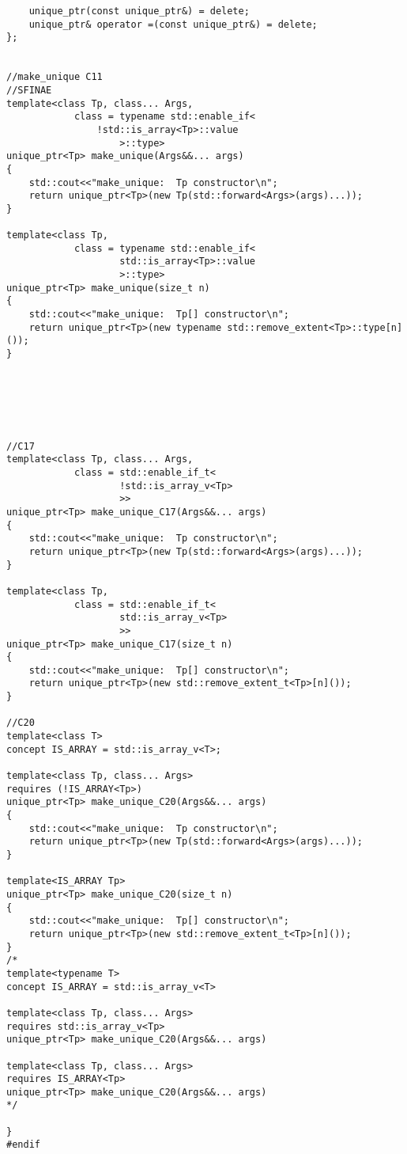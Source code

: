 \begin{lstlisting}
	unique_ptr(const unique_ptr&) = delete;
	unique_ptr& operator =(const unique_ptr&) = delete;
};


//make_unique C11
//SFINAE
template<class Tp, class... Args, 
			class = typename std::enable_if<
				!std::is_array<Tp>::value
					>::type>
unique_ptr<Tp> make_unique(Args&&... args)
{
	std::cout<<"make_unique:  Tp constructor\n";
	return unique_ptr<Tp>(new Tp(std::forward<Args>(args)...));
}

template<class Tp, 
			class = typename std::enable_if<
					std::is_array<Tp>::value
					>::type>
unique_ptr<Tp> make_unique(size_t n)
{
	std::cout<<"make_unique:  Tp[] constructor\n";
	return unique_ptr<Tp>(new typename std::remove_extent<Tp>::type[n]());
}






//C17
template<class Tp, class... Args, 
			class = std::enable_if_t<
					!std::is_array_v<Tp>
					>>
unique_ptr<Tp> make_unique_C17(Args&&... args)
{
	std::cout<<"make_unique:  Tp constructor\n";
	return unique_ptr<Tp>(new Tp(std::forward<Args>(args)...));
}

template<class Tp, 
			class = std::enable_if_t<
					std::is_array_v<Tp>
					>>
unique_ptr<Tp> make_unique_C17(size_t n)
{
	std::cout<<"make_unique:  Tp[] constructor\n";
	return unique_ptr<Tp>(new std::remove_extent_t<Tp>[n]());
}

//C20
template<class T> 
concept IS_ARRAY = std::is_array_v<T>;

template<class Tp, class... Args>
requires (!IS_ARRAY<Tp>)
unique_ptr<Tp> make_unique_C20(Args&&... args)
{
	std::cout<<"make_unique:  Tp constructor\n";
	return unique_ptr<Tp>(new Tp(std::forward<Args>(args)...));
}

template<IS_ARRAY Tp>
unique_ptr<Tp> make_unique_C20(size_t n)
{
	std::cout<<"make_unique:  Tp[] constructor\n";
	return unique_ptr<Tp>(new std::remove_extent_t<Tp>[n]());
}
/*
template<typename T>
concept IS_ARRAY = std::is_array_v<T>

template<class Tp, class... Args>
requires std::is_array_v<Tp>
unique_ptr<Tp> make_unique_C20(Args&&... args)

template<class Tp, class... Args>
requires IS_ARRAY<Tp>
unique_ptr<Tp> make_unique_C20(Args&&... args)
*/

}
#endif
\end{lstlisting}